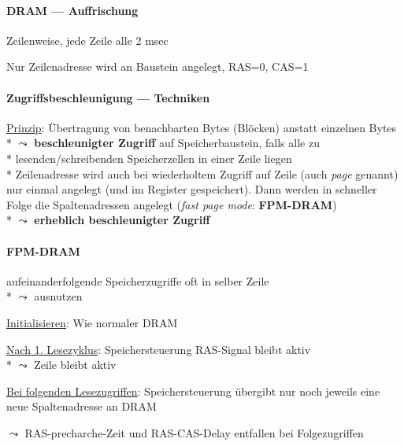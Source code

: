 \paragraph{DRAM --- Auffrischung}
\begin{items}
	\item Zeilenweise, jede Zeile alle 2 msec
	\item Nur Zeilenadresse wird an Baustein angelegt, RAS=0, CAS=1
\end{items}

\paragraph{Zugriffsbeschleunigung --- Techniken}
\begin{items}
	\item \underline{Prinzip}: Übertragung von benachbarten Bytes (Blöcken) anstatt einzelnen Bytes \\*
		\( \leadsto \) \textbf{beschleunigter Zugriff} auf Speicherbaustein, falls alle zu \\* \phantom{\( \leadsto \)} lesenden/schreibenden Speicherzellen in einer Zeile liegen \\*
		Zeilenadresse wird auch bei wiederholtem Zugriff auf Zeile (auch \emph{page} genannt) nur einmal angelegt (und im Register gespeichert). Dann werden in schneller Folge die Spaltenadressen angelegt (\emph{fast page mode}: \textbf{FPM-DRAM}) \\*
		\( \leadsto \) \textbf{erheblich beschleunigter Zugriff}
\end{items}

\paragraph{FPM-DRAM}
\begin{items}
	\item aufeinanderfolgende Speicherzugriffe oft in selber Zeile \\*
		 \( \leadsto \) ausnutzen
	\item \underline{Initialisieren}: Wie normaler DRAM
	\item \underline{Nach 1. Lesezyklus}: Speichersteuerung RAS-Signal bleibt aktiv \\*
		\( \leadsto \) Zeile bleibt aktiv
	\item \underline{Bei folgenden Lesezugriffen}: Speichersteuerung übergibt nur noch jeweils eine neue Spaltenadresse an DRAM
	\item \( \leadsto \) RAS-precharche-Zeit und RAS-CAS-Delay entfallen bei Folgezugriffen
\end{items}

